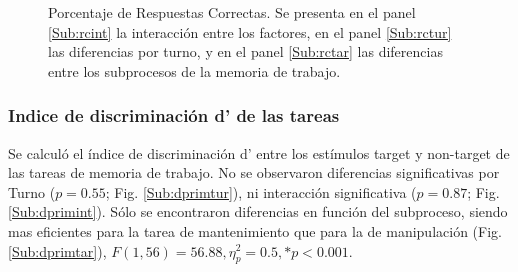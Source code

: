 \documentclass[12pt,letterpaper,final]{article}
\begin{document}
\begin{figure}[h]
	\caption{Porcentaje de Respuestas Correctas. Se presenta en el panel \ref{Sub:rcint} la interacción entre los factores, en el panel \ref{Sub:rctur} las diferencias por turno, y en el panel \ref{Sub:rctar} las diferencias entre los subprocesos de la memoria de trabajo.}
	\label{fig:rc}
\end{figure}

\subsubsection{Indice de discriminación d’ de las tareas}
Se calculó el índice de discriminación d’ entre los estímulos target y non-target de las tareas de memoria de trabajo.  No se observaron diferencias significativas por Turno ($p= 0.55$; Fig. \ref{Sub:dprimtur}), ni interacción significativa ($p= 0.87$; Fig. \ref{Sub:dprimint}). Sólo se encontraron diferencias en función del subproceso, siendo mas eficientes para la tarea de mantenimiento que para la de manipulación (Fig. \ref{Sub:dprimtar}),  $ F (1,56)= 56.88, \eta_{p}^{2}= 0.5,  *p<0.001.$
\end{document}
